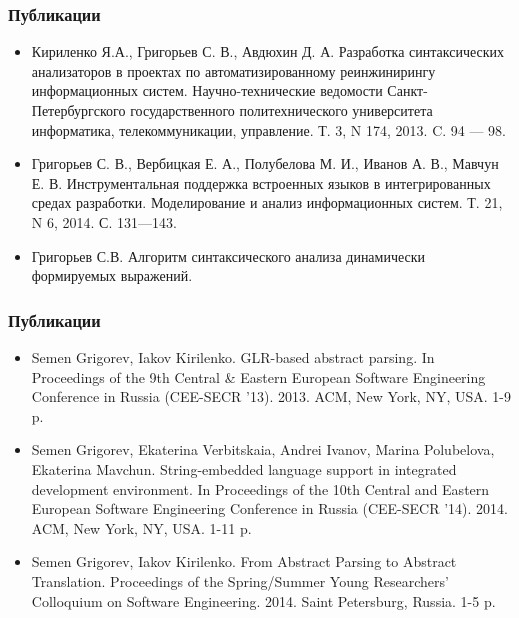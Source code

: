 \documentclass{beamer}
\begin{document}
\begin{frame}
    \transwipe[direction=90]
    \frametitle{Публикации}
  \begin{itemize}
      \item Кириленко Я.А., Григорьев С. В., Авдюхин Д. А. Разработка синтаксических анализаторов в проектах по автоматизированному реинжинирингу информационных систем.  Научно-технические ведомости Санкт-Петербургского государственного политехнического университета информатика, телекоммуникации, управление. Т. 3, N 174, 2013. C. 94 --- 98.
      \item Григорьев С. В., Вербицкая Е. А., Полубелова М. И., Иванов А. В., Мавчун Е. В. Инструментальная поддержка встроенных языков в интегрированных средах разработки. Моделирование и анализ информационных систем. Т. 21, N 6, 2014. С. 131---143.
          \item Григорьев С.В. Алгоритм синтаксического анализа динамически формируемых выражений.
  \end{itemize} 
\end{frame}

\begin{frame}
    \transwipe[direction=90]
    \frametitle{Публикации}
  \begin{itemize}
          \item Semen Grigorev, Iakov Kirilenko. GLR-based abstract parsing. In Proceedings of the 9th Central \& Eastern European Software Engineering Conference in Russia (CEE-SECR ’13). 2013. ACM, New York, NY, USA. 1-9 p.
          \item Semen Grigorev, Ekaterina Verbitskaia, Andrei Ivanov, Marina Polubelova, Ekaterina Mavchun. String-embedded language support in integrated development environment. In Proceedings of the 10th Central and Eastern European Software Engineering Conference in Russia (CEE-SECR '14). 2014. ACM, New York, NY, USA. 1-11 p.
          \item Semen Grigorev, Iakov Kirilenko. From Abstract Parsing to Abstract Translation. Proceedings of the Spring/Summer Young Researchers' Colloquium on Software Engineering. 2014. Saint Petersburg, Russia. 1-5 p.
  \end{itemize} 
\end{frame}
\end{document}

